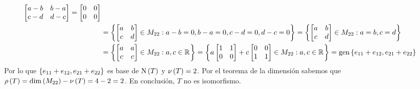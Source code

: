 \begin{solution}
\begin{align*}
{\begin{bmatrix}
				a - b & b - a\\
				c - d & d - c
			\end{bmatrix}
			=
			\begin{bmatrix}
				0 & 0\\
				0 & 0
			\end{bmatrix}
		}\\
		&=\set{
			\begin{bmatrix}
				a & b\\
				c & d
			\end{bmatrix}
			\in M_{22}: a - b = 0, b - a = 0, c - d = 0, d - c = 0
		}
		=\set{
			\begin{bmatrix}
				a & b\\
				c & d
			\end{bmatrix}
			\in M_{22}: a = b, c = d
		}\\
		&=\set{
			\begin{bmatrix}
				a & a\\
				c & c
			\end{bmatrix}
			\in M_{22}: a, c\in\rmath
		}
		=\set{
			a
			\begin{bmatrix}
				1 & 1\\
				0 & 0
			\end{bmatrix}
			+ c
			\begin{bmatrix}
				0 & 0\\
				1 & 1
			\end{bmatrix}
			\in M_{22}: a, c\in\rmath
		} =\mgen[1]{\set{e_{11} + e_{12}, e_{21} + e_{22}}}
	\end{align*}
	Por lo que $\left\{ e_{11} + e_{12}, e_{21} + e_{22} \right\}$ es base de $\mnuc{T}$ y $\mnu{T} = 2$. Por el teorema de la dimensión sabemos que $\mrho{T} =\mdim{M_{22}} -\mnu{T} = 4 - 2 = 2$. En conclusión, $T$ no es isomorfismo.
\end{solution}